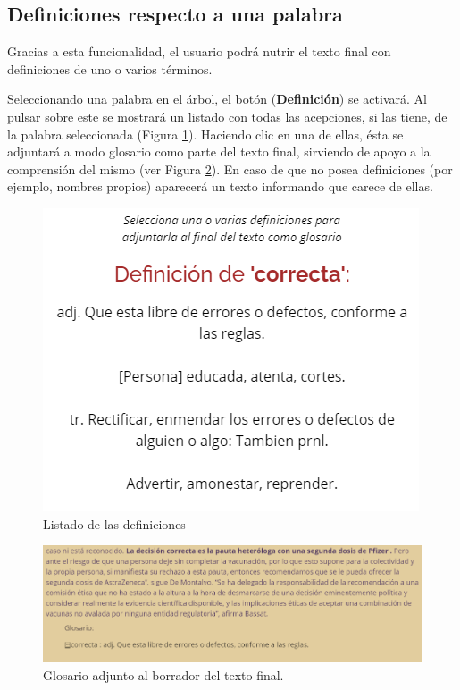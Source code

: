 \subsection{Definiciones respecto a una palabra}
 Gracias a esta funcionalidad, el usuario podrá nutrir el texto final con definiciones de uno o varios términos. 
 
 Seleccionando una palabra en el árbol, el botón (\textbf{Definición}) se activará. Al pulsar sobre este se mostrará un listado con todas las acepciones, si las tiene, de la palabra seleccionada (Figura \ref{fig:definiciones}). Haciendo clic en una de ellas, ésta se adjuntará a modo glosario como parte del texto final, sirviendo de apoyo a la comprensión del mismo (ver Figura \ref{fig:definicionesBorrador}). En caso de que no posea definiciones (por ejemplo, nombres propios) aparecerá un texto informando que carece de ellas.
 	 \begin{figure}[h!]
 	\centering
 	
 	
 	\includegraphics[scale=0.8]{Imagenes/Figuras/DefinicionesPersonas}
 	
 	
 	\caption{Listado de las definiciones}
 	\label{fig:definiciones}
 \end{figure}
 	 \begin{figure}[h!]
	\centering
	
	
	\includegraphics[scale=0.8]{Imagenes/Figuras/GlosarioBorrador}
	
	
	\caption{Glosario adjunto al borrador del texto final.}
	\label{fig:definicionesBorrador}
\end{figure}
